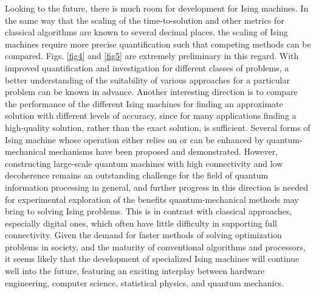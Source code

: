 \documentclass[fleqn,10pt]{wlscirep}
\def\fromNM#1{{\color{blue}\small{\bf } {\em #1}}}
\def\change#1{#1}
\begin{document}
Looking to the future,  there is much room for development for Ising machines.  In the same way that the scaling of the time-to-solution and other metrics for classical algorithms are known to several decimal places, the scaling of Ising machines require more precise quantification such that competing methods can be compared.  Figs. \ref{fig4} and \ref{fig5} are extremely preliminary in this regard. With improved quantification and investigation for different classes of problems, a better understanding of the suitability of various approaches for a particular problem can be known in advance. 
Another interesting direction  is to compare the performance of the different Ising machines for finding an approximate solution with different levels of accuracy, since for many applications finding a high-quality solution, rather than the exact solution, is sufficient.  
Several forms of Ising machine whose operation either relies on or can be enhanced by quantum-mechanical mechanisms have been proposed and demonstrated. However, constructing large-scale quantum machines with high connectivity and low decoherence remains an outstanding challenge for the field of quantum information processing in general, and further progress in this direction is needed for experimental exploration of the benefits quantum-mechanical methods may bring to solving Ising problems. \change{This is in contrast with classical approaches, especially digital ones, which often have little difficulty in supporting full connectivity.}
Given the demand for faster methods of solving optimization problems in society, and the maturity of conventional algorithms and processors, it seems likely that the development of specialized Ising machines will continue well into the future, featuring an exciting interplay between hardware engineering, computer science, statistical physics, and quantum mechanics.


%
\end{document}
